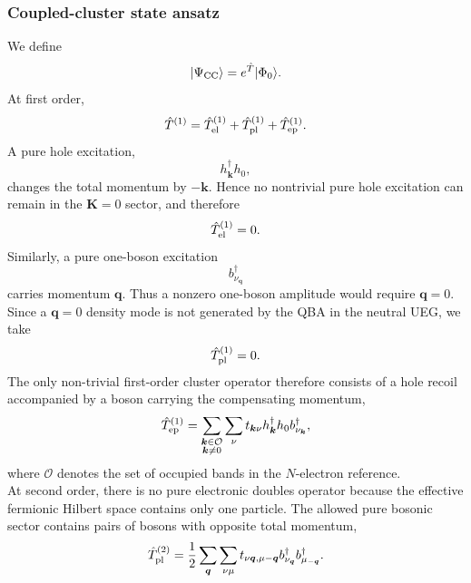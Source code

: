 \subsubsection{Coupled-cluster state ansatz}
We define
\begin{equation}
    |\Psi_{\rm CC}\rangle
    =
    e^{\hat{T}}|\Phi_0\rangle.
\end{equation}
At first order,
\begin{equation}
    \hat{T}^{(1)}
    =
    \hat{T}_{\rm el}^{(1)}
    +
    \hat{T}_{\rm pl}^{(1)}
    +
    \hat{T}_{\rm ep}^{(1)}.
\end{equation}
A pure hole excitation,
\begin{equation}
    h_{\bm{k}}^{\dagger}h_0,
\end{equation}
changes the total momentum by $-\bm{k}$. Hence no nontrivial pure
hole excitation can remain in the $\bm{K}=0$ sector, and therefore
\begin{equation}
    {
    \hat{T}_{\rm el}^{(1)}=0.
    }
\end{equation}
%
Similarly, a pure one-boson excitation
\begin{equation}
    b_{\nu_{\bm{q}}}^{\dagger}
\end{equation}
carries momentum $\bm{q}$. Thus a nonzero one-boson amplitude would
require $\bm{q}=0$. Since a $\bm{q}=0$ density mode is not generated by the QBA in the neutral UEG, we take
\begin{equation}
    {
    \hat{T}_{\rm pl}^{(1)}=0.
    }
\end{equation}
%
The only non-trivial first-order cluster operator therefore consists of a hole
recoil accompanied by a boson carrying the compensating momentum,
\begin{equation}
    {
    \hat{T}_{\rm ep}^{(1)}
    =
    \sum_{\substack{\bm{k}\in\mathcal{O}\\ \bm{k}\neq 0}}
    \sum_{\nu}
    t_{\bm{k}\nu}
    h_{\bm{k}}^{\dagger}
    h_0
    b_{\nu_{\bm{k}}}^{\dagger},
    }
\end{equation}
where $\mathcal{O}$ denotes the set of occupied bands in the
$N$-electron reference. \\
At second order, there is no pure electronic doubles operator because the effective
fermionic Hilbert space contains only one particle. The allowed pure bosonic sector contains pairs of
bosons with opposite total momentum,
\begin{equation}
    {
    \hat{T}_{\rm pl}^{(2)}
    =
    \frac{1}{2}
    \sum_{\bm{q}}
    \sum_{\nu\mu}
    t_{\nu\bm{q},\mu-\bm{q}}
    b_{\nu_{\bm{q}}}^{\dagger}
    b_{\mu_{-\bm{q}}}^{\dagger}.
    }
\end{equation}
